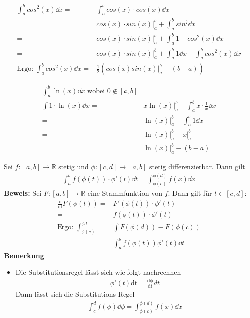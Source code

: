 \begin{Beispiel}{
	\begin{align*}
		\int_a^b cos^2(x) \dd{x} = & \int_a^b cos(x) \cdot cos(x) \dd{x} \\
		= & cos(x) \cdot sin(x) \vert_a^b + \int_a^b sin^2 \dd{x} \\
		= & cos(x) \cdot sin(x) \vert_a^b + \int_a^b 1 - cos^2(x) \dd{x} \\
		= &  cos(x) \cdot sin(x) \vert_a^b + \int_a^b 1 \dd{x} - \int_a^b cos^2(x) 
		\dd{x} \\
		\text{Ergo: } \int_a^b cos^2(x) \dd{x} = & \frac{1}{2} (cos(x) sin(x) 
		\vert_a^b - (b-a))
	\end{align*}
	
	\begin{align*}
		\int_a^b \ln (x) \dd{x} \text{ wobei } 0 \not\in [a,b] \\
		\int 1 \cdot \ln (x) \dd{x} = & x \ln (x)\vert_a^b - 
		\int_a^b x \cdot \frac{1}{x} \dd{x} \\
		= &  \ln (x)\vert_a^b - \int_a^b 1 \dd{x} \\
		= & \ln (x)\vert_a^b - x\vert_a^b \\
		= & \ln (x)\vert_a^b - (b - a)
	\end{align*}
}\end{Beispiel}

\begin{Satz}{
	Sei $f: [a,b] \rightarrow \mathbb{R}$ stetig und $\phi: [c,d] \rightarrow [a,b]$ 
	stetig differenzierbar. Dann gilt
	\begin{align*}
		\int_a^b f(\phi(t))\cdot\phi'(t)\dd{t} = \int_{\phi(c)}^{\phi(d)} 
		f(x) \dd{x}
	\end{align*}	 
	\textbf{Beweis:}
	Sei $F : [a,b] \rightarrow \mathbb{R}$ eine Stammfunktion von $f$. Dann gilt für 
	$t \in [c,d]$:
	\begin{align*}
		\frac{\mathrm{d}}{\mathrm{dt}}F(\phi(t)) = &  F'(\phi(t)) \cdot \phi'(t) \\
		= & f(\phi(t))\cdot \phi'(t) \\
		\text{Ergo: } \int_{\phi(c)}^{\phi{d}} = & \int F(\phi(d))-F(\phi(c)) \\
		= & \int_a^b f(\phi(t)) \phi'(t) \dd{t}
	\end{align*}
	\textbf{Bemerkung}
	\begin{itemize}
		\item Die Substitutionsregel lässt sich wie folgt nachrechnen
		\begin{align*}
			\phi'(t)\mathrm{dt} = \frac{\mathrm{d\phi}}{\mathrm{dt}}dt
		\end{align*}
		Dann lässt sich die Substitutions-Regel
		\begin{align*}
			\int_c^d f(\phi) \dd{\phi} = \int_{\phi(c)}^{\phi(d)} f(x) \dd{x}
		\end{align*}
	\end{itemize}
}\end{Satz}

